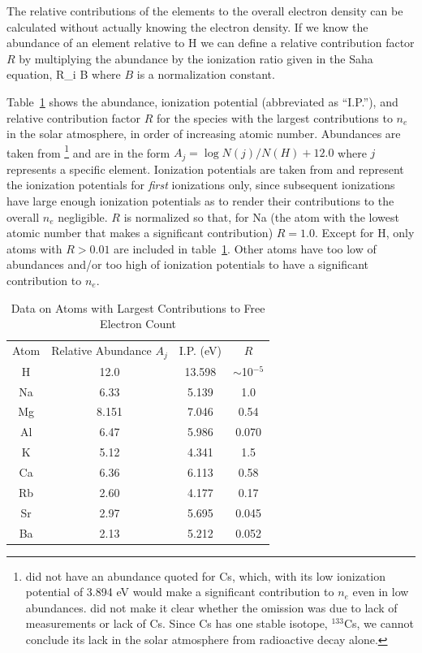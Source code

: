 The relative contributions of the elements to the overall electron
density can be calculated without actually knowing the electron
density.  If we know the abundance of an element relative to H we can
define a relative contribution factor $R$ by 
multiplying the abundance by the ionization ratio given in the Saha
equation,
\beq
R_i \equiv B  
\eeq
where $B$ is a normalization constant.

Table~\ref{tab:electroncontribution} shows the abundance, ionization
potential (abbreviated as ``I.P.''), and relative contribution factor $R$ for the species with
the largest contributions to $n_e$ in the solar atmosphere, in order
of increasing atomic number.
Abundances are taken
from \cite{grevesse1998}\footnote{\cite{grevesse1998} did not have an
abundance quoted for Cs, which, with its low ionization potential of
3.894 eV would make a significant contribution to $n_e$ even in low
abundances. \cite{grevesse1998} did not make it clear whether the
omission was due to lack of measurements or lack of Cs.  Since Cs has
one stable isotope, $^{133}$Cs, we cannot conclude its lack in the
solar atmosphere from radioactive decay alone.}   and are in the form $A_j
= \log N(j)/N(H) + 12.0$ where $j$ represents a specific element.
Ionization potentials are taken from \cite{moore1970} and represent
the ionization potentials for {\it first} ionizations only, since
subsequent ionizations have large enough ionization potentials as to
render their contributions to the overall $n_e$ negligible.  $R$ is
normalized so that, for Na (the atom with the lowest atomic number
that makes a significant contribution) $R=1.0$.  Except for H, only
atoms with $R>0.01$ are included in
table~\ref{tab:electroncontribution}.  Other atoms have
too low of abundances and/or too high of ionization potentials to have a
significant contribution to $n_e$.
\begin{table}[h]
\caption{\label{tab:electroncontribution}Data on Atoms with Largest Contributions to Free Electron Count}
\begin{tabular}{c c c c}
Atom & Relative Abundance $A_j$ & I.P. (eV)& $R$\\
H & 12.0 & 13.598 & $\sim$10$^{-5}$\\
Na & 6.33 & 5.139 & 1.0 \\
Mg & 8.151 & 7.046 & 0.54\\
Al & 6.47 & 5.986 & 0.070\\
K  & 5.12 & 4.341 & 1.5\\
Ca & 6.36 & 6.113 & 0.58\\
Rb & 2.60 & 4.177 & 0.17\\
Sr & 2.97 & 5.695 & 0.045\\
Ba & 2.13 & 5.212 & 0.052\\
\end{tabular}
\end{table}

